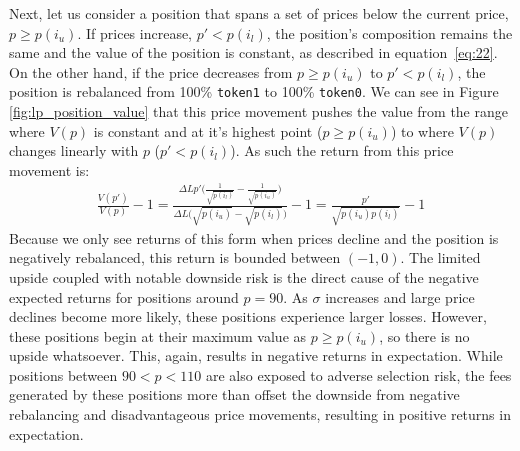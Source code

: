 \documentclass[11pt]{article}
\begin{document}
Next, let us consider a position that spans a set of prices below the current price, $p \ge p(i_u)$. If prices increase, $p' < p(i_l)$, the position's composition remains the same and the value of the position is constant, as described in equation~\eqref{eq:22}. On the other hand, if the price decreases from $p \ge p(i_u)$ to $p' < p(i_l)$, the position is rebalanced from 100\% \texttt{token1} to 100\% \texttt{token0}. We can see in Figure \ref{fig:lp_position_value} that this price movement pushes the value from the range where $V(p)$ is constant and at it's highest point ($p \ge p(i_u)$) to where $V(p)$ changes linearly with $p$ ($p' < p(i_l)$). As such the return from this price movement is:
\begin{gather}
    \frac{V(p')}{V(p)} - 1 = \frac{\Delta L p' \bigg( \frac{1}{\sqrt{p(i_l)}} - \frac{1}{\sqrt{p(i_u)}} \bigg)}{\Delta L \big( \sqrt{p(i_u)} - \sqrt{p(i_l)} \big)} - 1 = \frac{p'}{\sqrt{p(i_u) p(i_l)}} - 1
\end{gather}
Because we only see returns of this form when prices decline and the position is negatively rebalanced, this return is bounded between $(-1, 0)$. The limited upside coupled with notable downside risk is the direct cause of the negative expected returns for positions around $p=90$. As $\sigma$ increases and large price declines become more likely, these positions experience larger losses. However, these positions begin at their maximum value as $p \ge p(i_u)$, so there is no upside whatsoever. This, again, results in negative returns in expectation. While positions between $90 < p < 110$ are also exposed to adverse selection risk, the fees generated by these positions more than offset the downside from negative rebalancing and disadvantageous price movements, resulting in positive returns in expectation.
\end{document}
